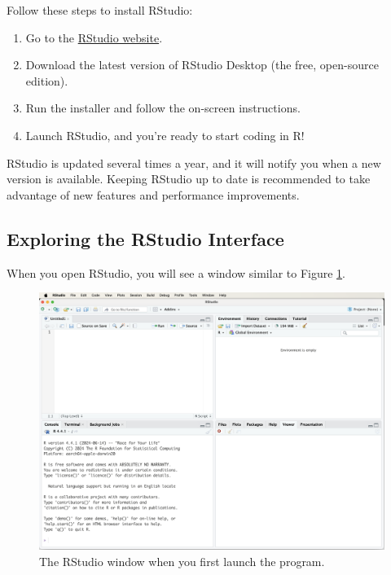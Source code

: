 \documentclass[
]{book}
\providecommand{\tightlist}{%
  \setlength{\itemsep}{0pt}\setlength{\parskip}{0pt}}
\theoremstyle{definition}
\theoremstyle{definition}
\theoremstyle{definition}
\theoremstyle{definition}
\theoremstyle{remark}
\begin{document}
Follow these steps to install RStudio:

\begin{enumerate}
\def\labelenumi{\arabic{enumi}.}
\tightlist
\item
  Go to the \href{http://www.rstudio.com/download}{RStudio website}.\\
\item
  Download the latest version of RStudio Desktop (the free, open-source edition).\\
\item
  Run the installer and follow the on-screen instructions.\\
\item
  Launch RStudio, and you're ready to start coding in R!
\end{enumerate}

RStudio is updated several times a year, and it will notify you when a new version is available. Keeping RStudio up to date is recommended to take advantage of new features and performance improvements.

\subsection*{Exploring the RStudio Interface}\label{exploring-the-rstudio-interface}

When you open RStudio, you will see a window similar to Figure \ref{fig:RStudio-window-1}.

\begin{figure}

{\centering \includegraphics[width=0.7\linewidth]{images/ch1_RStudio-window-1} 

}

\caption{The RStudio window when you first launch the program.}\label{fig:RStudio-window-1}
\end{figure}
\end{document}
